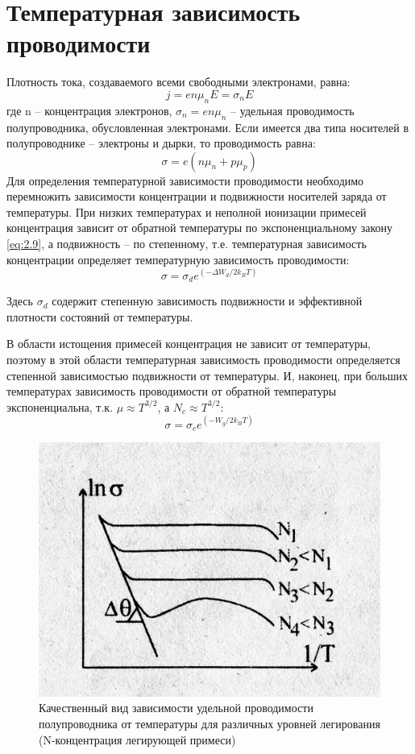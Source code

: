 \section{Температурная зависимость проводимости}
Плотность тока, создаваемого всеми свободными электронами, равна:
\begin{equation}
	j=e n \mu_{n} E=\sigma_{n} E
	\label{eq:4.1}
\end{equation}
где n – концентрация электронов, $\sigma_n = e n \mu_n$ – удельная проводимость полупроводника, обусловленная электронами.
Если имеется два типа носителей в полупроводнике – электроны и дырки,
то проводимость равна:
\begin{equation}
	\sigma=e\left(n \mu_{n}+p \mu_{p}\right)
	\label{eq:4.2}
\end{equation}
Для определения температурной зависимости проводимости необходимо перемножить зависимости концентрации и подвижности носителей заряда от
температуры. При низких температурах и неполной ионизации примесей концентрация зависит от обратной температуры по экспоненциальному закону
\eqref{eq:2.9}, а подвижность – по степенному, т.е. температурная зависимость концентрации определяет температурную зависимость проводимости:
\begin{equation}
	\sigma=\sigma_{d} e^{\left(-\Delta W_{d} / 2 k_{B} T\right)}
	\label{eq:4.3}
\end{equation}

Здесь $\sigma_d$ содержит степенную зависимость подвижности и эффективной плотности состояний от температуры.

В области истощения примесей концентрация не зависит от температуры, поэтому в этой области температурная зависимость проводимости определяется
степенной зависимостью подвижности от температуры. И, наконец, при больших температурах зависимость проводимости от
обратной температуры экспоненциальна, т.к. $\mu \approx T^{3/2}$, а  $N_c \approx T^{3/2}$:
 \begin{equation}
	\sigma=\sigma_{c} e^{\left(-W_{g} / 2 k_{B} T\right)}
	 \label{eq:4.4}
 \end{equation}
 \begin{figure}[h!]
	\centering
	\includegraphics[width = .5\linewidth]{img/41.jpg}
	\caption{Качественный вид зависимости удельной проводимости полупроводника от температуры для различных уровней легирования (N-концентрация легирующей примеси)}
	\label{fig:4.1}
\end{figure}
 
